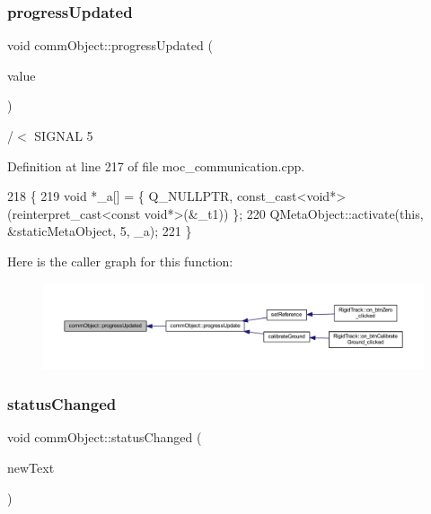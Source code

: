 \subsubsection{\texorpdfstring{progress\+Updated}{progressUpdated}}
{\footnotesize\ttfamily void comm\+Object\+::progress\+Updated (\begin{DoxyParamCaption}\item[{int}]{value }\end{DoxyParamCaption})\hspace{0.3cm}{\ttfamily [signal]}}



/$<$ S\+I\+G\+N\+AL 5 



Definition at line 217 of file moc\+\_\+communication.\+cpp.


\begin{DoxyCode}
218 \{
219     \textcolor{keywordtype}{void} *\_a[] = \{ Q\_NULLPTR, \textcolor{keyword}{const\_cast<}\textcolor{keywordtype}{void}*\textcolor{keyword}{>}(\textcolor{keyword}{reinterpret\_cast<}\textcolor{keyword}{const }\textcolor{keywordtype}{void}*\textcolor{keyword}{>}(&\_t1)) \};
220     QMetaObject::activate(\textcolor{keyword}{this}, &staticMetaObject, 5, \_a);
221 \}
\end{DoxyCode}
Here is the caller graph for this function\+:\nopagebreak
\begin{figure}[H]
\begin{center}
\leavevmode
\includegraphics[width=350pt]{classcomm_object_a6039d306f25a6b46c78942edf9cee662_icgraph}
\end{center}
\end{figure}
\mbox{\label{classcomm_object_adccf5b5946d35d5cf6d76f367f93e335}} 
\subsubsection{\texorpdfstring{status\+Changed}{statusChanged}}
{\footnotesize\ttfamily void comm\+Object\+::status\+Changed (\begin{DoxyParamCaption}\item[{Q\+String}]{new\+Text }\end{DoxyParamCaption})\hspace{0.3cm}{\ttfamily [signal]}}



